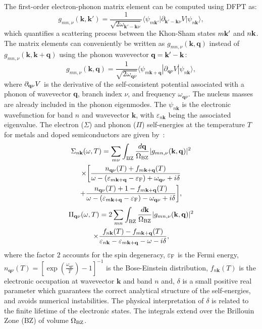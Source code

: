 \documentclass[final,3p,times,twocolumn]{elsarticle}
\begin{document}
The first-order electron-phonon matrix element can be computed using DFPT as:	
\begin{equation}\label{elphmatrixoriginal}
	g_{mn,\nu}(\mathbf{k,k'}) =  \frac{1}{\sqrt{2 \omega_{\mathbf{k'-k}\nu} }} \langle \psi_{m\mathbf{k}'} | \partial_{\mathbf{k'-k}\nu}V | \psi_{n\mathbf{k}}\rangle,
\end{equation}
which quantifies a scattering process between the Khon-Sham states $m\bf{k'}$ and $n\bf{k}$. The matrix elements can conveniently be written as $g_{mn,\nu}(\mathbf{k,q})$ instead of $g_{mn,\nu}(\mathbf{k,k+q})$ using the phonon wavevector $\bf{q}={\bf{k'-k}}$: 					
\begin{equation}\label{elphmatrix}
	g_{mn,\nu}(\mathbf{k,q}) =  \frac{1}{\sqrt{2 \omega_{\mathbf{q}\nu}} } \langle \psi_{m\mathbf{k+q}}  | \partial_{\mathbf{q}\nu}V | \psi_{n\mathbf{k}} \rangle,
\end{equation}
where $\partial_{{\bf q}\nu}V$ is the derivative of the self-consistent potential associated with a phonon of wavevector \textbf{q}, branch index $\nu$, and frequency $\omega_{\mathbf{q}\nu}$. 
The nucleus masses are already included in the phonon eigenmodes.
The $\psi_{n\mathbf{k}}$ is the electronic wavefunction for band $n$ and wavevector $\mathbf{k}$, with $\varepsilon_{n\mathbf{k}}$ being the associated eigenvalue.     
The electron ($\Sigma$) and phonon ($\Pi$) self-energies at the temperature $T$ for metals and doped semiconductors are given by~\cite{Noffsinger2010,Giustino2016}:
\begin{multline}\label{elselfenergy}
   \Sigma_{n\mathbf{k}}(\omega,T) =  \sum_{m\nu} \int_{\rm BZ} \frac{d\mathbf{q}}{\Omega_{\rm BZ}} | g_{mn,\nu}(\mathbf{k,q}) |^2 \\
    \times \bigg[\frac{n_{\mathbf{q}\nu}(T)+f_{m\mathbf{k+q}}(T)}{\omega - (\varepsilon_{m\mathbf{k+q}}-\varepsilon_{\rm F}) +\omega_{\mathbf{q}\nu}+i\delta}\\
    + \frac{n_{\mathbf{q}\nu}(T)+1-f_{m\mathbf{k+q}}(T)}{\omega - (\varepsilon_{m\mathbf{k+q}}-\varepsilon_{\rm F}) - \omega_{\mathbf{q}\nu}+i\delta}\bigg], 
\end{multline}      
\begin{multline}\label{phselfenergy}
  \Pi_{\mathbf{q}\nu}(\omega,T) =  2\sum_{mn} \int_{\rm BZ} \frac{d\mathbf{k}}{\Omega_{\rm BZ}} | g_{mn,\nu}(\mathbf{k,q}) |^2 \\
    \times \frac{f_{n\mathbf{k}}(T)-f_{m\mathbf{k+q}}(T)}{\varepsilon_{n\mathbf{k}} - \varepsilon_{m\mathbf{k+q}}-\omega-i\delta}, 
\end{multline}  
where the factor $2$ accounts for the spin degeneracy, $\varepsilon_{\rm F}$ is the Fermi energy, $n_{\mathbf{q}\nu}(T)=[\exp(\frac{\omega_{\mathbf{q}\nu}}{T})-1]^{-1}$ is the Bose-Einstein distribution, $f_{n\mathbf{k}}(T)$ is the electronic occupation at wavevector $\mathbf{k}$ and band $n$ and, $\delta$ is a small positive real parameter which guarantees the correct analytical structure of the self-energies, and avoids numerical instabilities. The physical interpretation of $\delta$ is related to the finite lifetime of the electronic states. The integrals extend over the Brillouin Zone (BZ) of volume $\Omega_{\rm BZ}$.
\end{document}
